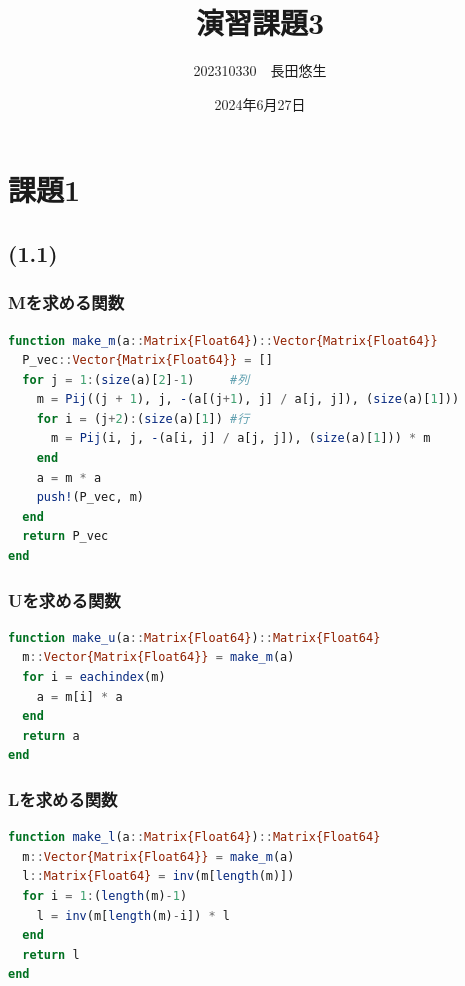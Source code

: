 \documentclass[uplatex, dvipdfmx, a4j,11pt]{jsarticle}
\title{演習課題3}
\author{202310330　長田悠生}
\date{2024年6月27日}
\begin{document}
\section*{課題1}
\subsection*{(1.1)}
\subsubsection*{Mを求める関数}

\begin{lstlisting}[title={(1.1)}, label=code:in, language=Julia]
function make_m(a::Matrix{Float64})::Vector{Matrix{Float64}}
  P_vec::Vector{Matrix{Float64}} = []
  for j = 1:(size(a)[2]-1)     #列
    m = Pij((j + 1), j, -(a[(j+1), j] / a[j, j]), (size(a)[1]))
    for i = (j+2):(size(a)[1]) #行
      m = Pij(i, j, -(a[i, j] / a[j, j]), (size(a)[1])) * m
    end
    a = m * a
    push!(P_vec, m)
  end
  return P_vec
end
\end{lstlisting}

\subsubsection*{Uを求める関数}

\begin{lstlisting}[title={(1.1)}, label=code:in, language=Julia]
function make_u(a::Matrix{Float64})::Matrix{Float64}
  m::Vector{Matrix{Float64}} = make_m(a)
  for i = eachindex(m)
    a = m[i] * a
  end
  return a
end
\end{lstlisting}

\subsubsection*{Lを求める関数}

\begin{lstlisting}[title={(1.1)}, label=code:in, language=Julia]
function make_l(a::Matrix{Float64})::Matrix{Float64}
  m::Vector{Matrix{Float64}} = make_m(a)
  l::Matrix{Float64} = inv(m[length(m)])
  for i = 1:(length(m)-1)
    l = inv(m[length(m)-i]) * l
  end
  return l
end
\end{lstlisting}
\end{document}
